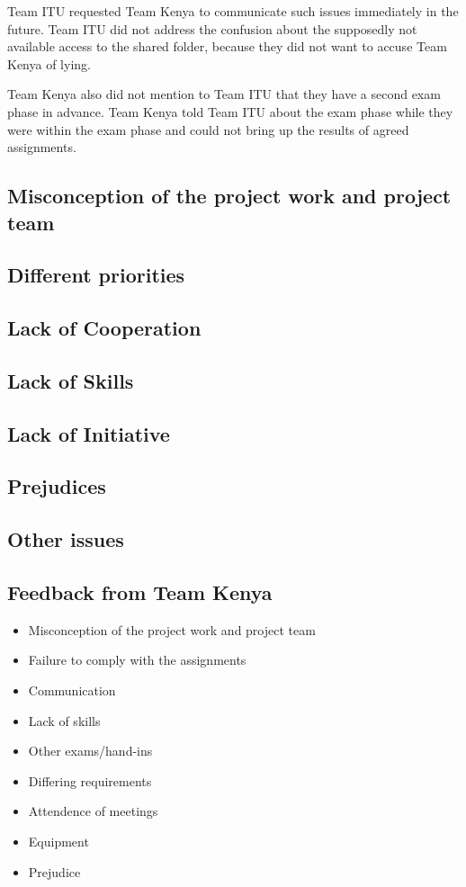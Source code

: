 Team ITU requested Team Kenya to communicate such issues immediately in the future. Team ITU did not address the confusion about the supposedly not available access to the shared folder, because they did not want to accuse Team Kenya of lying.

Team Kenya also did not mention to Team ITU that they have a second exam phase in advance. Team Kenya told Team ITU about the exam phase while they were within the exam phase and could not bring up the results of agreed assignments.

\subsection{Misconception of the project work and project team}

\subsection{Different priorities}

\subsection{Lack of Cooperation}

\subsection{Lack of Skills}

\subsection{Lack of Initiative}

\subsection{Prejudices}

\subsection{Other issues}

\subsection{Feedback from Team Kenya}


	\begin{itemize}

		\item Misconception of the project work and project team
		\item Failure to comply with the assignments
		\item Communication
		\item Lack of skills
		\item Other exams/hand-ins
		\item Differing requirements
		\item Attendence of meetings
		\item Equipment
		\item Prejudice
	\end{itemize}

